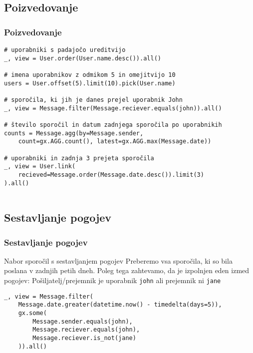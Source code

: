 \documentclass{beamer}
\begin{document}
    \subsection{Poizvedovanje}
    \begin{frame}[fragile]
    \frametitle{Poizvedovanje}
    \footnotesize
    \begin{verbatim}
# uporabniki s padajočo ureditvijo
_, view = User.order(User.name.desc()).all()

# imena uporabnikov z odmikom 5 in omejitvijo 10
users = User.offset(5).limit(10).pick(User.name)

# sporočila, ki jih je danes prejel uporabnik John
_, view = Message.filter(Message.reciever.equals(john)).all()

# število sporočil in datum zadnjega sporočila po uporabnikih
counts = Message.agg(by=Message.sender, 
    count=gx.AGG.count(), latest=gx.AGG.max(Message.date))

# uporabniki in zadnja 3 prejeta sporočila
_, view = User.link(
    recieved=Message.order(Message.date.desc()).limit(3)
).all()
    
    \end{verbatim}
    \end{frame}
    
    \subsection{Sestavljanje pogojev}
    \begin{frame}[fragile]
    \frametitle{Sestavljanje pogojev}
    \begin{block}{Nabor sporočil s sestavljanjem pogojev}
    Preberemo vsa sporočila, ki so bila poslana v zadnjih petih dneh. Poleg tega zahtevamo, da je izpolnjen eden izmed pogojev: Pošiljatelj/prejemnik je uporabnik {\tt john} ali prejemnik ni {\tt jane}
    \end{block} 
    \footnotesize
    \begin{verbatim}
_, view = Message.filter(
    Message.date.greater(datetime.now() - timedelta(days=5)), 
    gx.some(
        Message.sender.equals(john),
        Message.reciever.equals(john),
        Message.reciever.is_not(jane)
    )).all()
        \end{verbatim}   
    \end{frame}
\end{document}
